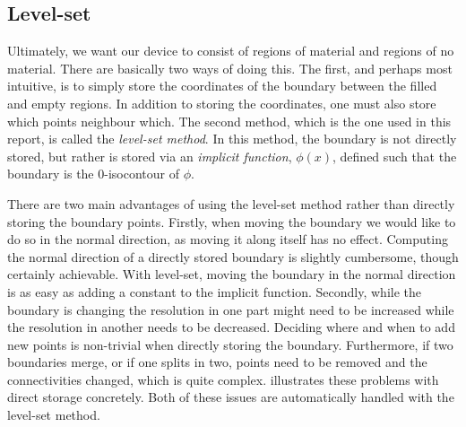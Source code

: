 



\subsection{Level-set}\label{sec:level-set}

Ultimately, we want our device to consist of regions of material and regions of
no material.
There are basically two ways of doing this.
The first, and perhaps most intuitive,
is to simply store the coordinates of the boundary between the filled and empty
regions.
In addition to storing the coordinates, one must also store which points
neighbour which.
The second method, which is the one used in this report, is called
the \emph{level-set method}.
In this method, the boundary is not directly stored, but rather is stored via an
\emph{implicit function}, $\phi(x)$, defined such that the boundary is the
0-isocontour of $\phi$.

There are two main advantages of using the level-set method rather than
directly storing the boundary points.
Firstly, when moving the boundary we would like to do so in the normal
direction, as moving it along itself has no effect.
Computing the normal direction of a directly stored boundary is slightly cumbersome,
though certainly achievable.
With level-set, moving the boundary in the normal direction is as easy as adding
a constant to the implicit function.
Secondly, while the boundary is changing the resolution in one part might need
to be increased while the resolution in another needs to be decreased. Deciding
where and when to add new points is non-trivial when directly storing the
boundary. Furthermore, if two boundaries merge, or if one splits in two, points
need to be removed and the connectivities changed, which is quite complex.
 illustrates these problems with direct storage concretely.
Both of these issues are automatically handled with the level-set method.

